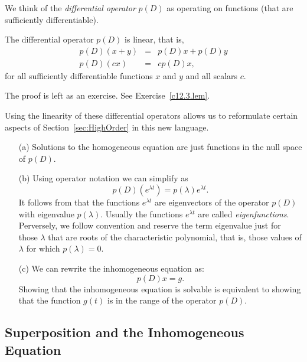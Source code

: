 \documentclass{ximera}
\begin{document}
We think of the {\em differential 
operator\/} $p(D)$ as operating on 
functions (that are sufficiently differentiable). 
\begin{lemma}  \label{L:p(D)linear}
The differential operator $p(D)$ is linear, that is,
\begin{eqnarray*}
p(D)(x+y) & = & p(D)x + p(D)y \\
p(D)(cx) & = & cp(D)x,
\end{eqnarray*}
for all sufficiently differentiable functions $x$ and $y$ and all scalars $c$.
\end{lemma}
The proof is left as an exercise.  See Exercise~\ref{c12.3.lem}.

Using the linearity of these differential operators allows us to reformulate
certain aspects of Section~\ref{sec:HighOrder} in this new language.

\begin{enumerate}
\item[(a)]  Solutions to the homogeneous equation  are just 
functions in the null space 
of $p(D)$.  
\item[(b)]  Using operator notation we can simplify  as
\begin{equation}  \label{e:elam2}
p(D)\left(e^{\lambda t}\right) = p(\lambda)e^{\lambda t}.
\end{equation}
It follows from  that the functions $e^{\lambda t}$ are 
eigenvectors 
of the operator $p(D)$ with eigenvalue $p(\lambda)$.  
Usually the functions $e^{\lambda t}$ are called 
{\em eigenfunctions}.
Perversely, we follow convention and reserve the term eigenvalue just 
for those $\lambda$ that are roots of the characteristic polynomial, that 
is, those values of $\lambda$ for which $p(\lambda)=0$.
\item[(c)]  We can rewrite the 
inhomogeneous equation as:
\[
p(D)x = g.
\]
Showing that the inhomogeneous equation is solvable is
equivalent to showing that the 
function $g(t)$ is in the range 
of the operator $p(D)$.
\end{enumerate}

\subsection*{Superposition and the Inhomogeneous Equation}
\end{document}
